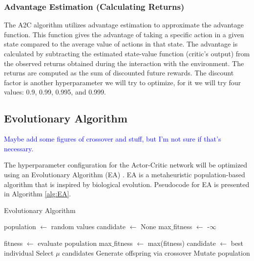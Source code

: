 \documentclass{article}
\newcommand{\TODO}[1]{\textcolor{blue}{#1}}
\begin{document}
\subsubsection{Advantage Estimation (Calculating Returns)}
The A2C algorithm utilizes advantage estimation to approximate the advantage function. This function gives the advantage of taking a specific action in a given state compared to the average value of actions in that state. The advantage is calculated by subtracting the estimated state-value function (critic's output) from the observed returns obtained during the interaction with the environment. The returns are computed as the sum of discounted future rewards.  The discount factor is another hyperparameter we will try to optimize, for it we will try four values: 0.9, 0.99, 0.995, and 0.999.


\subsection{Evolutionary Algorithm} \label{ssec:EA}
\TODO{
    Maybe add some figures of crossover and stuff, but I'm not sure if that's necessary.
    
}

The hyperparameter configuration for the Actor-Critic network will be optimized using an Evolutionary Algorithm (EA) \cite{Simon2013EvolutionaryOA}. EA is a metaheuristic population-based algorithm that is inspired by biological evolution. Pseudocode for EA is presented in Algorithm \ref{alg:EA}.

\begin{algorithm}[htbp]
    \caption{Evolutionary Algorithm}
    \label{alg:EA}
    \begin{algorithmic}[1]
        \STATE population $\gets$ random values
        \STATE candidate $\gets$ None
        \STATE max$\_$fitness $\gets$ -$\infty$
        
            \STATE fitness $\gets$ evaluate population
            	\STATE max$\_$fitness $\gets$ max(fitness)
            	\STATE candidate $\gets$ best individual
            \ENDIF
            \STATE Select $\mu$ candidates
            \STATE Generate offspring via crossover
            \STATE Mutate population
        \ENDFOR        
    \end{algorithmic}
\end{algorithm}
\end{document}
